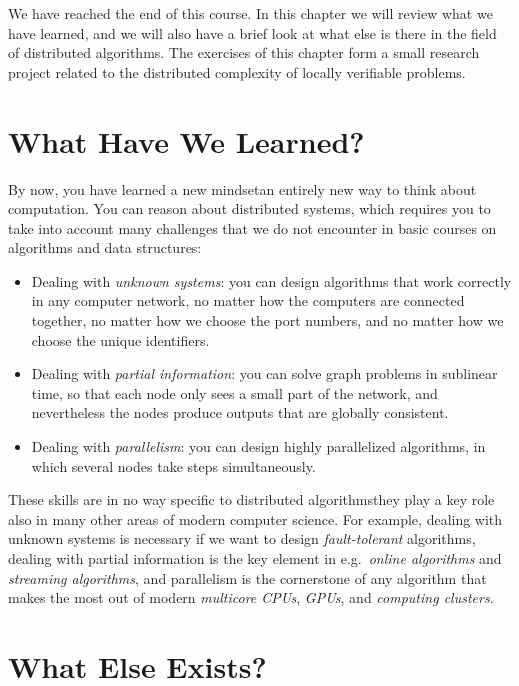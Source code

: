 

\noindent
We have reached the end of this course. In this chapter we will review what we have learned, and we will also have a brief look at what else is there in the field of distributed algorithms. The exercises of this chapter form a small research project related to the distributed complexity of locally verifiable problems.


\section{What Have We Learned?}

By now, you have learned a new mindset\mydash an entirely new way to think about computation. You can reason about distributed systems, which requires you to take into account many challenges that we do not encounter in basic courses on algorithms and data structures:
\begin{itemize}
    \item Dealing with \emph{unknown systems}: you can design algorithms that work correctly in any computer network, no matter how the computers are connected together, no matter how we choose the port numbers, and no matter how we choose the unique identifiers.
    \item Dealing with \emph{partial information}: you can solve graph problems in sublinear time, so that each node only sees a small part of the network, and nevertheless the nodes produce outputs that are globally consistent.
    \item Dealing with \emph{parallelism}: you can design highly parallelized algorithms, in which several nodes take steps simultaneously.
\end{itemize}
These skills are in no way specific to distributed algorithms\mydash they play a key role also in many other areas of modern computer science. For example, dealing with unknown systems is necessary if we want to design \emph{fault-tolerant} algorithms, dealing with partial information is the key element in e.g.\ \emph{online algorithms} and \emph{streaming algorithms}, and parallelism is the cornerstone of any algorithm that makes the most out of modern \emph{multicore CPUs}, \emph{GPUs}, and \emph{computing clusters}.


\section{What Else Exists?}

